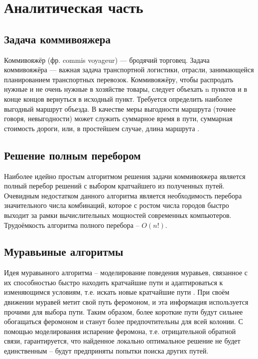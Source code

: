 \chapter{Аналитическая часть}

\section{Задача коммивояжера}

Коммивояжёр (фр. {\ttfamily commis voyageur}) — бродячий торговец. Задача коммивояжёра — важная задача транспортной логистики, отрасли, занимающейся планированием транспортных перевозок. Коммивояжёру, чтобы распродать нужные и не очень нужные в хозяйстве товары, следует объехать n пунктов и в конце концов вернуться в исходный пункт. Требуется определить наиболее выгодный маршрут объезда. В качестве меры выгодности маршрута (точнее говоря, невыгодности) может служить суммарное время в пути, суммарная стоимость дороги, или, в простейшем случае, длина маршрута \cite{commi2}.


\section{Решение полным перебором}

Наиболее идейно простым алгоритмом решения задачи коммивояжера \cite{commi} является полный перебор решений с выбором кратчайшего из полученных путей. Очевидным недостатком данного алгоритма является необходимость перебора значительного числа комбинаций, которое с ростом числа городов быстро выходит за рамки вычислительных мощностей современных компьютеров. Трудоёмкость алгоритма полного перебора -- $O(n!)$.

\section{Муравьиные алгоритмы}

Идея муравьиного алгоритма -- моделирование поведения муравьев, связанное с их способностью быстро находить кратчайшие пути и адаптироваться к изменяющимся условиям, т.е. искать новые кратчайшие пути \cite{ant1}. При своём движении муравей метит свой путь феромоном, и эта информация используется прочими для выбора пути. Таким образом, более короткие пути будут сильнее обогащаться феромоном и станут более предпочтительны для всей колонии. С помощью моделирования испарение феромона, т.е. отрицательной обратной связи, гарантируется, что найденное локально оптимальное решение не будет единственным -- будут предприняты попытки поиска других путей.



